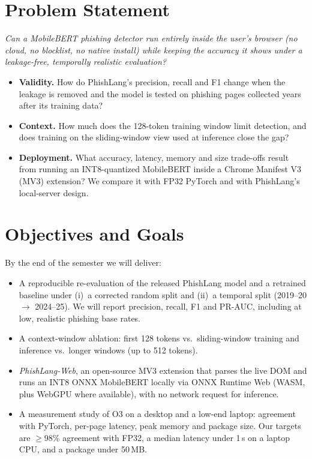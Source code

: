 \documentclass[11pt]{article}
\begin{document}
\section{Problem Statement}
\emph{Can a MobileBERT phishing detector run entirely inside the user's browser (no cloud, no blocklist, no native install) while keeping the accuracy it shows under a leakage-free, temporally realistic evaluation?}
\begin{itemize}
  \item[\textbf{RQ1}] \textbf{Validity.} How do PhishLang's precision, recall and F1 change when the leakage is removed and the model is tested on phishing pages collected years after its training data?
  \item[\textbf{RQ2}] \textbf{Context.} How much does the 128-token training window limit detection, and does training on the sliding-window view used at inference close the gap?
  \item[\textbf{RQ3}] \textbf{Deployment.} What accuracy, latency, memory and size trade-offs result from running an INT8-quantized MobileBERT inside a Chrome Manifest V3 (MV3) extension? We compare it with FP32 PyTorch and with PhishLang's local-server design.
\end{itemize}

\section{Objectives and Goals}
By the end of the semester we will deliver:
\begin{itemize}
  \item[\textbf{O1}] A reproducible re-evaluation of the released PhishLang model and a retrained baseline under (i)~a corrected random split and (ii)~a temporal split (2019--20 $\rightarrow$ 2024--25). We will report precision, recall, F1 and PR-AUC, including at low, realistic phishing base rates.
  \item[\textbf{O2}] A context-window ablation: first 128 tokens vs.\ sliding-window training and inference vs.\ longer windows (up to 512 tokens).
  \item[\textbf{O3}] \emph{PhishLang-Web}, an open-source MV3 extension that parses the live DOM and runs an INT8 ONNX MobileBERT locally via ONNX Runtime Web (WASM, plus WebGPU where available), with no network request for inference.
  \item[\textbf{O4}] A measurement study of O3 on a desktop and a low-end laptop: agreement with PyTorch, per-page latency, peak memory and package size. Our targets are $\geq$98\% agreement with FP32, a median latency under 1\,s on a laptop CPU, and a package under 50\,MB.
\end{itemize}
\end{document}
